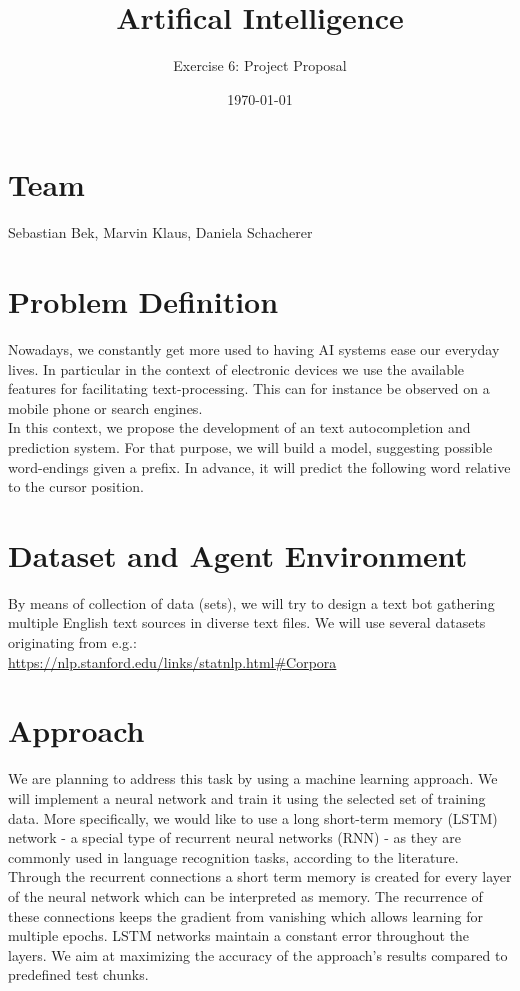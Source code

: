 \documentclass[a4paper,11pt]{scrartcl}
\title{\vspace{-1cm}Artifical Intelligence}
\subtitle{Exercise 6: Project Proposal} \date{\today}
\begin{document}
\maketitle

\section*{Team}
Sebastian Bek, Marvin Klaus, Daniela Schacherer
\section*{Problem Definition}

Nowadays, we constantly get more used to having AI systems ease our everyday lives. In particular in the context of electronic devices we use the available features for facilitating text-processing. This can for instance be observed on a mobile phone or search engines. \\
In this context, we propose the development of an text autocompletion and prediction system. For that purpose, we will build a model, suggesting possible word-endings given a prefix. In advance, it will predict the following word relative to the cursor position.

\section*{Dataset and Agent Environment}

By means of collection of data (sets), we will try to design a text bot gathering multiple English text sources in diverse text files. We will use several datasets originating from e.g.:\\
\url{https://nlp.stanford.edu/links/statnlp.html#Corpora}\\

\section*{Approach}

We are planning to address this task by using a machine learning approach. We will implement a neural network and train it using the selected set of training data. More specifically, we would like to use a long short-term memory (LSTM) network - a special type of recurrent neural networks (RNN) - as they are commonly used in language recognition tasks, according to the literature. Through the recurrent connections a short term memory is created for every layer of the neural network which can be interpreted as memory. The recurrence of these connections keeps the gradient from vanishing which allows learning for multiple epochs. LSTM networks maintain a constant error throughout the layers.
We aim at maximizing the accuracy of the approach's results compared to predefined test chunks.\\
\end{document}
